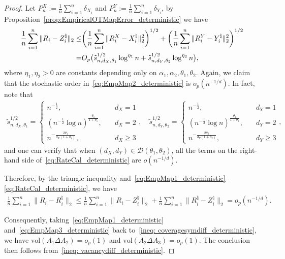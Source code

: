 \documentclass[11pt]{article}
\begin{document}
\begin{proof}
Let $P_n^X:= \frac{1}{n}\sum_{i = 1}^n \delta_{X_i}$ and $P_n^Y:= \frac{1}{n}\sum_{i = 1}^n \delta_{Y_i}$, by Proposition~\ref{prop:EmpiricalOTMapError_deterministic} we have 
\begin{align}
    \frac{1}{n}\sum_{i = 1}^n \|R_i - Z_i^\natural \|_2 \leq & \biggl(\frac{1}{n}\sum_{i = 1}^n \|R_i^X -  X_i^\natural\|_2^2 \biggr)^{1/2}+  \biggl(\frac{1}{n}\sum_{i = 1}^n \|R_i^Y -  Y_i^\natural \|_2^2 \biggr)^{1/2} \notag \\ 
    = & O_p\bigl(\tilde s_{n, d_X, \theta_1}^{1/2}\log^{\eta_1} n + \tilde s_{n, d_Y, \theta_2}^{1/2} \log^{\eta_2} n\bigr) \label{eq:EmpMap2_deterministic},
\end{align}
where $\eta_1, \eta_2>0$ are constants depending only on $\alpha_1, \alpha_2, \theta_1, \theta_2$. Again, we claim that the stochastic order in~\eqref{eq:EmpMap2_deterministic} is $o_p(n^{-1/d})$. In fact, note that 
\begin{align}
    \tilde s_{n, d_X, \theta_1}^{1/2} = \begin{cases}
        n^{-\frac{1}{2}}, \quad & d_X = 1 \\ 
        (n^{-\frac{1}{2}} \log n)^{\frac{\theta_1}{1+\theta_1}}, \quad &d_X =2 \\ 
        n^{-\frac{2\theta_1}{d_X(1+\theta_1)}}, \quad & d_X \geq 3
    \end{cases}, \quad 
    \tilde s_{n, d_Y, \theta_2}^{1/2} = \begin{cases}
    n^{-\frac{1}{2}}, \quad & d_Y = 1 \\ 
    (n^{-\frac{1}{2}} \log n)^{\frac{\theta_2}{1+\theta_2}}, \quad & d_Y =2 \\ 
    n^{-\frac{2\theta_2}{d_Y(1+\theta_2)}}, \quad & d_Y \geq 3
\end{cases}, \label{eq:RateCal_deterministic}
\end{align}
and one can verify that when $(d_X, d_Y) \in \mathcal{D}(\theta_1, \theta_2)$, all the terms on the right-hand side of~\eqref{eq:RateCal_deterministic} are $o(n^{-1/d})$.

Therefore, by the triangle inequality and~\eqref{eq:EmpMap1_deterministic}--\eqref{eq:RateCal_deterministic}, we have
\begin{align}
    \frac{1}{n}\sum_{i = 1}^n  \|R_i - {R}_i^\natural\|_2  \leq \frac{1}{n}\sum_{i = 1}^n \|R_i - Z_i^\natural \|_2 + \frac{1}{n}\sum_{i = 1}^n \|R_i^\natural - Z_i^\natural \|_2 = o_p(n^{-1/d}). \label{eq:EmpMap3_deterministic}
\end{align}

Consequently, taking~\eqref{eq:EmpMap1_deterministic} and~\eqref{eq:EmpMap3_deterministic} back to~\eqref{ineq: coveragesymdiff_deterministic}, we have $\mathrm{vol}(A_1\Delta {A}_2) = o_p(1)$ and $\mathrm{vol}(A_2 \Delta {A}_3) = o_p(1)$. The conclusion then follows from~\eqref{ineq: vacancydiff_deterministic}.
\end{proof}
\end{document}
